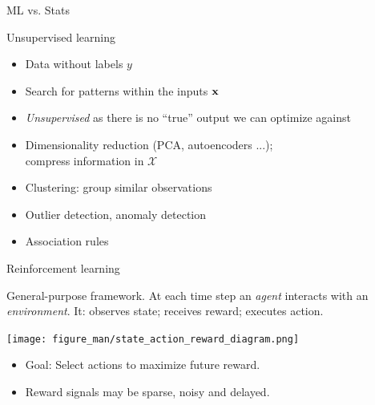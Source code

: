 \documentclass[11pt,compress,t,notes=noshow, xcolor=table]{beamer}
\begin{document}
\begin{frame}{ML vs. Stats}
\vfill 

\end{frame}


\begin{vbframe}{Unsupervised learning}
\begin{itemize}
  \item Data without labels $y$
  \item Search for patterns within the inputs $\mathbf{x}$
  \item \textit{Unsupervised} as there is no ``true'' output
      we can optimize against
\end{itemize}

\vspace{1em}

{
\vspace{2em}
\begin{itemize}
    \item Dimensionality reduction (PCA, autoencoders ...);\\ 
        compress information in $\mathcal X$
    \item Clustering: group similar observations
    \item Outlier detection, anomaly detection
    \item Association rules
\end{itemize}

}
\end{vbframe}

\begin{vbframe}{Reinforcement learning}

General-purpose framework.
At each time step an \emph{agent} interacts with an \emph{environment}. 
It: observes state; receives reward; executes action.

\begin{center}
  \texttt{[image: figure\_man/state\_action\_reward\_diagram.png]}
\end{center}


\begin{itemize}
\item Goal: Select actions to maximize future reward.
\item Reward signals may be sparse, noisy and delayed.
\end{itemize}

\end{vbframe}
\end{document}
